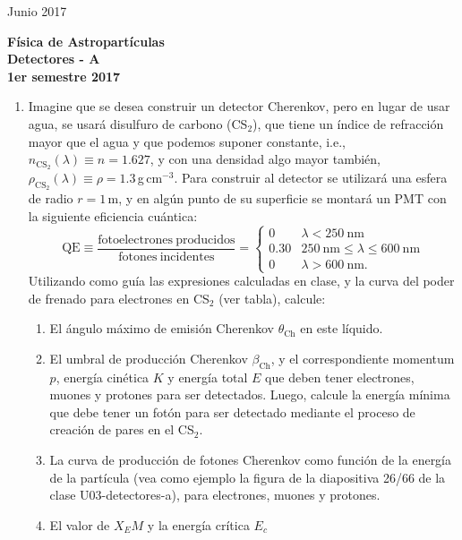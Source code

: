 \documentclass[11pt]{article}
\begin{document}
\pagestyle{empty}
{Junio 2017}
\begin{center}
	{\Large \bf Física de Astropartículas} \\
{ \large \bf Detectores - A} \\ {\bf 1er semestre 2017}
\end{center}

\setcounter{enumi}{0}      %
\begin{enumerate}
	\item Imagine que se desea construir un detector Cherenkov, pero en lugar
		de usar agua, se usará disulfuro de carbono (CS$_2$), que tiene un
		índice de refracción mayor que el agua y que podemos suponer constante,
		i.e., $n_{\mathrm{CS}_2}(\lambda) \equiv n = 1.627$, y con una densidad
		algo mayor también, $\rho_{\mathrm{CS}_2}(\lambda) \equiv \rho =
		1.3$\,g\,cm$^{-3}$. Para construir al detector se utilizará una esfera
		de radio $r=1$\,m, y en algún punto de su superficie se montará un PMT
		con la siguiente eficiencia cuántica:
		$$
			\mathrm{QE} \equiv \frac{\mathrm{fotoelectrones\
			producidos}}{\mathrm{fotones\ incidentes}} = 
			\begin{cases}
				0    & \lambda < 250\mathrm{\ nm} \\
				0.30 & 250\mathrm{\ nm} \leq \lambda \leq 600\mathrm{\ nm} \\
				0    & \lambda > 600\mathrm{\ nm}.
			\end{cases}
		$$
		Utilizando como guía las expresiones calculadas en clase, y la curva
		del poder de frenado para electrones en CS$_2$ (ver tabla), calcule:
		\begin{enumerate}
			\item El ángulo máximo de emisión Cherenkov $\theta_{\mathrm{Ch}}$
				en este líquido. 
			\item El umbral de producción Cherenkov $\beta_{\mathrm{Ch}}$, y el
				correspondiente momentum $p$, energía cinética $K$ y energía
				total $E$ que deben tener electrones, muones y protones para
				ser detectados.  Luego, calcule la energía mínima que debe
				tener un fotón para ser detectado mediante el proceso de
				creación de pares en el CS$_2$.
			\item La curva de producción de fotones Cherenkov como función de
				la energía de la partícula (vea como ejemplo la figura de la
				diapositiva 26/66 de la clase U03-detectores-a), para
				electrones, muones y protones.
			\item El valor de $X_EM$ y la energía crítica $E_c$

\end{enumerate}
\end{enumerate}
\end{document}
